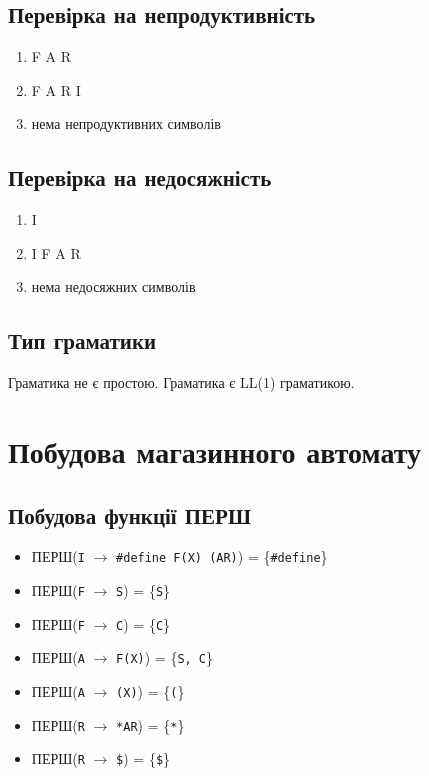 \subsection{Перевірка на непродуктивність}
\begin{enumerate}
    \item  F A R
    \item  F A R I
    \item  нема непродуктивних символів
\end{enumerate}

\subsection{Перевірка на недосяжність}
\begin{enumerate}
    \item  I
    \item  I F A R
    \item  нема недосяжних символів
\end{enumerate}

\subsection{Тип граматики}
Граматика не є простою. Граматика є LL(1) граматикою.


\newpage
\section{Побудова магазинного автомату}
\subsection{Побудова функції ПЕРШ}
\begin{itemize}
    \item  ПЕРШ(\verb|I| $\to$ \verb|#define F(X) (AR)|) = \{\verb|#define|\}
    \item  ПЕРШ(\verb|F| $\to$ \verb|S|) = \{\verb|S|\}
    \item  ПЕРШ(\verb|F| $\to$ \verb|C|) = \{\verb|C|\}
    \item  ПЕРШ(\verb|A| $\to$ \verb|F(X)|) = \{\verb|S, C|\}
    \item  ПЕРШ(\verb|A| $\to$ \verb|(X)|) = \{\verb|(|\}
    \item  ПЕРШ(\verb|R| $\to$ \verb|*AR|) = \{\verb|*|\}
    \item  ПЕРШ(\verb|R| $\to$ \verb|$|) = \{\verb|$|\}
\end{itemize}

